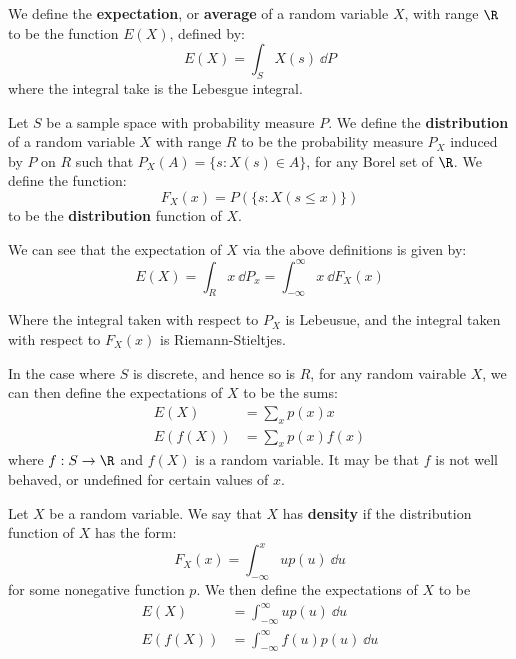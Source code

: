 \begin{definition}
    We define the \textbf{expectation}, or  \textbf{average} of a random
    variable $X$, with range  $\R$ to be the function $E(X)$, defined by:
    \begin{equation}
        E(X)=\int_{S}{X(s)} \ \dd{P}
    \end{equation}
    where the integral take is the Lebesgue integral.
\end{definition}

\begin{definition}
    Let $S$ be a sample space with probability measure  $P$. We define the
    \textbf{distribution} of a random variable $X$ with range $R$ to be the
    probability measure $P_X$ induced by  $P$ on  $R$ such that  $P_X(A)=\{s :
    X(s) \in A\}$, for any Borel set of $\R$. We define the function:
    \begin{equation}
        F_X(x)=P(\{s : X(s \leq x)\})
    \end{equation}
    to be the \textbf{distribution} function of $X$.
\end{definition}

We can see that the expectation of $X$ via the above definitions is given by:
\begin{equation*}
    E(X)=\int_{R}{x} \ \dd{P_x}=\int_{-\infty}^{\infty}{x} \ \dd{F_X(x)}
\end{equation*}

Where the integral taken with respect to $P_X$ is Lebeusue, and the integral
taken with respect to  $F_X(x)$ is Riemann-Stieltjes.

In the case where $S$ is discrete, and hence so is  $R$, for any random vairable
$X$, we can then define the expectations of  $X$ to be the sums:
    \begin{align}
        E(X)        &=      \sum_{x}{p(x)x} \\
        E(f(X))     &=      \sum_{x}{p(x)f(x)}
    \end{align}
where $f:S \rightarrow \R$ and $f(X)$ is a random variable. It may be that $f$
is not well behaved, or undefined for certain values of  $x$.

\begin{definition}
    Let $X$ be a random variable. We say that $X$ has  \textbf{density} if the
    distribution function of $X$ has the form:
    \begin{equation}
        F_X(x)=\int_{-\infty}^x{up(u)} \ \dd{u}
    \end{equation}
    for some nonegative function $p$. We then define the expectations of  $X$ to
    be
    \begin{align}
        E(X)        &=      \int_{-\infty}^{\infty}{up(u)} \ \dd{u} \\
        E(f(X))        &=      \int_{-\infty}^{\infty}{f(u)p(u)} \ \dd{u} \\
    \end{align}
\end{definition}

